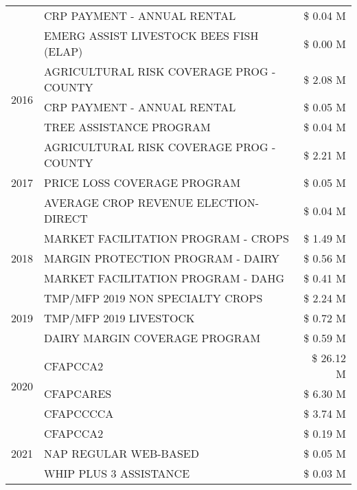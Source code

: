 \begin{tabular}{llr}
 & CRP PAYMENT - ANNUAL RENTAL & \$ 0.04 M \\
 & EMERG ASSIST LIVESTOCK BEES FISH (ELAP) & \$ 0.00 M \\
\cline{1-3}
\multirow[t]{3}{*}{2016} & AGRICULTURAL RISK COVERAGE PROG - COUNTY & \$ 2.08 M \\
 & CRP PAYMENT - ANNUAL RENTAL & \$ 0.05 M \\
 & TREE ASSISTANCE PROGRAM & \$ 0.04 M \\
\cline{1-3}
\multirow[t]{3}{*}{2017} & AGRICULTURAL RISK COVERAGE PROG - COUNTY & \$ 2.21 M \\
 & PRICE LOSS COVERAGE PROGRAM & \$ 0.05 M \\
 & AVERAGE CROP REVENUE ELECTION-DIRECT & \$ 0.04 M \\
\cline{1-3}
\multirow[t]{3}{*}{2018} & MARKET FACILITATION PROGRAM - CROPS & \$ 1.49 M \\
 & MARGIN PROTECTION PROGRAM - DAIRY & \$ 0.56 M \\
 & MARKET FACILITATION PROGRAM - DAHG & \$ 0.41 M \\
\cline{1-3}
\multirow[t]{3}{*}{2019} & TMP/MFP 2019 NON SPECIALTY CROPS & \$ 2.24 M \\
 & TMP/MFP 2019 LIVESTOCK & \$ 0.72 M \\
 & DAIRY MARGIN COVERAGE PROGRAM & \$ 0.59 M \\
\cline{1-3}
\multirow[t]{3}{*}{2020} & CFAPCCA2 & \$ 26.12 M \\
 & CFAPCARES & \$ 6.30 M \\
 & CFAPCCCCA & \$ 3.74 M \\
\cline{1-3}
\multirow[t]{3}{*}{2021} & CFAPCCA2 & \$ 0.19 M \\
 & NAP REGULAR WEB-BASED & \$ 0.05 M \\
 & WHIP PLUS 3 ASSISTANCE & \$ 0.03 M \\
\cline{1-3}
\bottomrule
\end{tabular}
